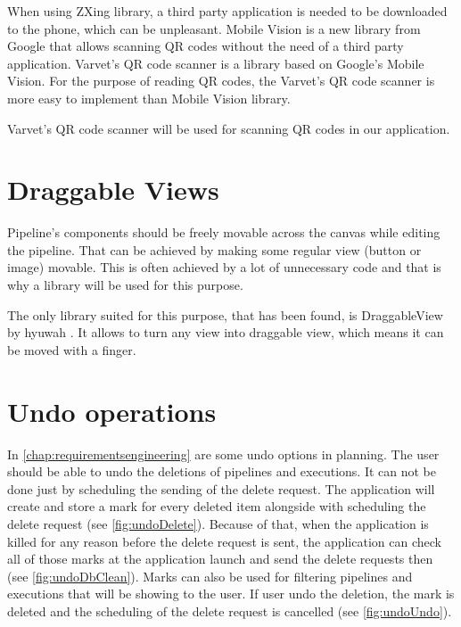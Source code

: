 When using ZXing library, a third party application is needed to be downloaded to the phone, which can be unpleasant.
Mobile Vision is a new library from Google that allows scanning QR codes without the need of a third party application.
Varvet's QR code scanner is a library based on Google's Mobile Vision.
For the purpose of reading QR codes, the Varvet's QR code scanner is more easy to implement than Mobile Vision library.

Varvet's QR code scanner will be used for scanning QR codes in our application.

\section{Draggable Views}
Pipeline's components should be freely movable across the canvas while editing the pipeline.
That can be achieved by making some regular view (button or image) movable.
This is often achieved by a lot of unnecessary code and that is why a library will be used for this purpose.

The only library suited for this purpose, that has been found, is DraggableView by hyuwah \cite{draggable}.
It allows to turn any view into draggable view, which means it can be moved with a finger.

\section{Undo operations}
In \autoref{chap:requirementsengineering} are some undo options in planning.
The user should be able to undo the deletions of pipelines and executions.
It can not be done just by scheduling the sending of the delete request.
The application will create and store a mark for every deleted item alongside with scheduling the delete request (see \autoref{fig:undoDelete}).
Because of that, when the application is killed for any reason before the delete request is sent, the application can check all of those marks at the application launch and send the delete requests then (see \autoref{fig:undoDbClean}).
Marks can also be used for filtering pipelines and executions that will be showing to the user.
If user undo the deletion, the mark is deleted and the scheduling of the delete request is cancelled (see \autoref{fig:undoUndo}).

